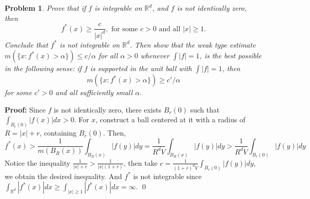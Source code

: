 \documentclass[12pt]{article}
\newtheorem{problem}{Problem}
\begin{document}
\begin{problem}
Prove that if $f$ is integrable on $\mathbb{R}^{d}$, and $f$ is not identically zero, then 
$$
f^{*}(x)\geq \frac{c}{|x|^{d}}, \text{ for some } c > 0 \text{ and all } |x| \geq 1.
$$ Conclude that $f^{*}$ is not integrable on $\mathbb{R}^{d}$. Then show that the weak type estimate $m(\{x: f^{*}(x) > \alpha\}) \leq c/\alpha$ for all $\alpha > 0 $ whenever $\int |f| = 1$, is the best possible in the following sense: if $f$ is supported in the unit ball with $\int |f| = 1$, then   
$$
m(\{x : f^{*}(x) > \alpha\}) \geq c'/\alpha
$$ for some $c' > 0$ and all sufficiently small $\alpha$.
\end{problem}

\textbf{Proof:} Since $f$ is not identically zero, there exists $B_{r}(0)$ such that $\int_{B_{r}(0)}|f(x)|dx > 0$. For $x$, construct a ball centered at it with a radius of $R = |x| + r$, containing $B_{r}(0)$. Then, 
$$
f^{*}(x) > \frac{1}{m(B_{R}(x))}\int_{B_{R}(x)}|f(y)|dy = \frac{1}{R^{d}V}\int_{B_{R}(x)}|f(y)|dy > \frac{1}{R^dV}\int_{B_{r}(0)}|f(y)|dy
$$
Notice the inequality $\frac{1}{|x| + r}>\frac{1}{|x|(1+r)}$, then take $c = \frac{1}{(1+r)^{d}V}\int_{B_{r}(0)}|f(y)|dy$, we obtain the desired inequality. And $f^{*}$ is not integrable since $\int_{\mathbb{R}^{d}}|f^{*}(x)|dx \geq \int_{|x| \geq 1}|f^{*}(x)|dx = \infty$. \qed 
\end{document}
